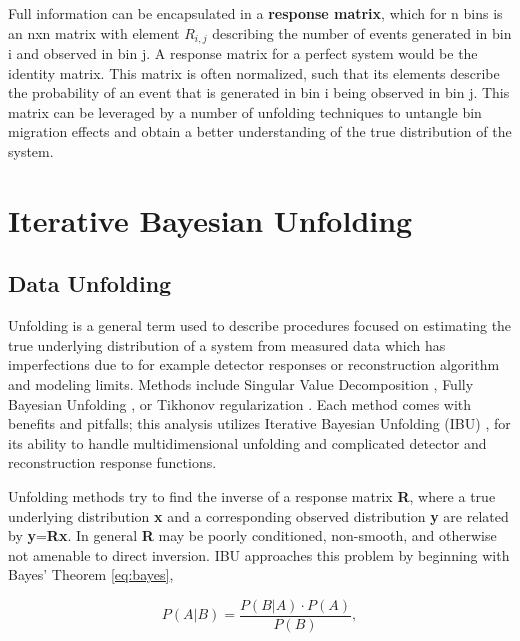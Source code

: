     

    Full information can be encapsulated in a \textbf{response matrix}, which for n bins is an nxn matrix with element $R_{i,j}$ describing the number of events generated in bin i and observed in bin j. A response matrix for a perfect system would be the identity matrix. This matrix is often normalized, such that its elements describe the probability of an event that is generated in bin i being observed in bin j. This matrix can be leveraged by a number of unfolding techniques to untangle bin migration effects and obtain a better understanding of the true distribution of the system. 


 \clearpage

\section{Iterative Bayesian Unfolding}

    \subsection{Data Unfolding}

        Unfolding is a general term used to describe procedures focused on estimating the true underlying distribution of a system from measured data which has imperfections due to for example detector responses or reconstruction algorithm and modeling limits. Methods include Singular Value Decomposition \parencite{Klema1980TheApplications}, Fully Bayesian Unfolding \cite{Choudalakis2012FullyUnfolding}, or Tikhonov regularization \parencite{Hoerl1970RidgeProblems}. Each method comes with benefits and pitfalls; this analysis utilizes Iterative Bayesian Unfolding (IBU) \parencite{DAgostini1995ATheorem}, \parencite{DAgostini2010ImprovedUnfolding} for its ability to handle multidimensional unfolding and complicated detector and reconstruction response functions. 

        Unfolding methods try to find the inverse of a response matrix \textbf{R}, where a true underlying distribution \textbf{x} and a corresponding observed distribution \textbf{y} are related by \textbf{y}=\textbf{Rx}. In general \textbf{R} may be poorly conditioned, non-smooth, and otherwise not amenable to direct inversion. IBU approaches this problem by beginning with Bayes' Theorem \eqref{eq:bayes},

        \begin{equation}
            P(A|B) = \frac{P(B|A) \cdot P(A)}{P(B)},
        \end{equation}\label{eq:bayes}

